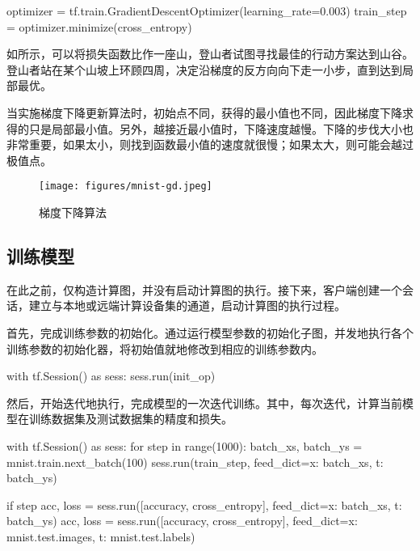 \begin{content}
\begin{content}
\begin{leftbar}
\begin{python}
optimizer = tf.train.GradientDescentOptimizer(learning_rate=0.003)
train_step = optimizer.minimize(cross_entropy)
\end{python}
\end{leftbar}

如所示，可以将损失函数比作一座山，登山者试图寻找最佳的行动方案达到山谷。登山者站在某个山坡上环顾四周，决定沿梯度的反方向向下走一小步，直到达到局部最优。

当实施梯度下降更新算法时，初始点不同，获得的最小值也不同，因此梯度下降求得的只是局部最小值。另外，越接近最小值时，下降速度越慢。下降的步伐大小也非常重要，如果太小，则找到函数最小值的速度就很慢；如果太大，则可能会越过极值点。

\begin{figure}[H]
\centering
\texttt{[image: figures/mnist-gd.jpeg]}
\caption{梯度下降算法}
 \label{fig:mnist-gd}
\end{figure}

\subsection{训练模型}

在此之前，\tf{}仅构造计算图，并没有启动计算图的执行。接下来，客户端创建一个会话，建立与本地或远端计算设备集的通道，启动计算图的执行过程。

首先，完成训练参数的初始化。通过运行模型参数的初始化子图，并发地执行各个训练参数的初始化器，将初始值就地修改到相应的训练参数内。

\begin{leftbar}
\begin{python}
with tf.Session() as sess:
  sess.run(init_op)
\end{python}
\end{leftbar}

然后，开始迭代地执行，完成模型的一次迭代训练。其中，每次迭代，计算当前模型在训练数据集及测试数据集的精度和损失。

\begin{leftbar}
\begin{python}
with tf.Session() as sess:
  for step in range(1000):
    batch_xs, batch_ys = mnist.train.next_batch(100)        
    sess.run(train_step, feed_dict={x: batch_xs, t: batch_ys})
    
    if step %
      acc, loss = sess.run([accuracy, cross_entropy], 
        feed_dict={x: batch_xs, t: batch_ys})
      acc, loss = sess.run([accuracy, cross_entropy], 
        feed_dict={x: mnist.test.images, t: mnist.test.labels}) 
\end{python}
\end{leftbar}


\end{content}
\end{content}
